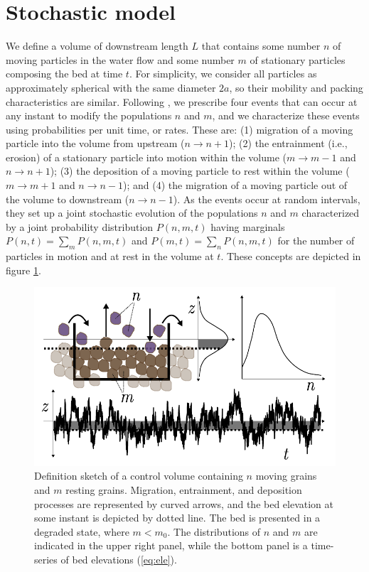 \documentclass[draft]{agujournal2018}
\begin{document}
\section{Stochastic model}
\label{sec:theory}

We define a volume of downstream length $L$ that contains some number $n$ of moving particles in the water flow and some number $m$ of stationary particles composing the bed at time $t$.
For simplicity, we consider all particles as approximately spherical with the same diameter $2a$, so their mobility and packing characteristics are similar.
Following \citet{Ancey2008}, we prescribe four events that can occur at any instant to modify the populations $n$ and $m$, and we characterize these events using probabilities per unit time, or rates.
These are: (1) migration of a moving particle into the volume from upstream ($n \rightarrow n+1$); (2) the entrainment (i.e., erosion) of a stationary particle into motion within the volume ($m\rightarrow m-1$ and $n\rightarrow n+1$); (3) the deposition of a moving particle to rest within the volume ($m\rightarrow m+1$ and $n\rightarrow n-1$); and (4) the migration of a moving particle out of the volume to downstream ($n\rightarrow n-1$).
As the events occur at random intervals, they set up a joint stochastic evolution of the populations $n$ and $m$ characterized by a joint probability distribution $P(n,m,t)$ having marginals $P(n,t) = \sum_m P(n,m,t)$ and $P(m,t) = \sum_n P(n,m,t)$ for the number of particles in motion and at rest in the volume at $t$.
These concepts are depicted in figure \ref{fig:concept}.
\begin{figure}
  \includegraphics[width=\linewidth,keepaspectratio]{./figures/definition-combo.pdf}
  \vspace{-1.0cm}
  \caption{Definition sketch of a control volume containing $n$ moving grains and $m$ resting grains. Migration, entrainment, and deposition processes are represented by curved arrows, and the bed elevation at some instant is depicted by dotted line. The bed is presented in a degraded state, where $m<m_0$. The distributions of $n$ and $m$ are indicated in the upper right panel, while the bottom panel is a time-series of bed elevations (\ref{eq:ele}).}
  \label{fig:concept}
\vspace{-0.75cm}
\end{figure}
\end{document}
